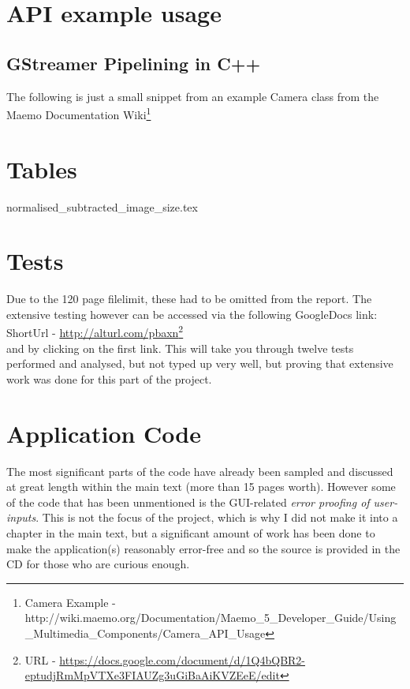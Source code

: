\section{API example usage}
\subsection{GStreamer Pipelining in C++}
 The following is just a small snippet from an example Camera class from the Maemo Documentation Wiki\footnote{Camera Example - http://wiki.maemo.org/Documentation/Maemo\_5\_Developer\_Guide/Using\_Multimedia\_Components/Camera\_API\_Usage}

\begin{frame}{}
\vspace{-20pt}

\end{frame}

\section{Tables}
{normalised_subtracted_image_size.tex}

\section{Tests}\label{append:tests}
Due to the 120 page filelimit, these had to be omitted from the report. The extensive testing however can be accessed via the following GoogleDocs link:\\\tab ShortUrl - \url{http://alturl.com/pbaxn}\footnote{URL - \url{https://docs.google.com/document/d/1Q4bQBR2-eptudjRmMpVTXe3FIAUZg3uGiBaAiKVZEeE/edit}}\\ and by clicking on the first link. This will take you through twelve tests performed and analysed, but not typed up very well, but proving that extensive work was done for this part of the project.

\section{Application Code}
The most significant parts of the code have already been sampled and discussed at great length within the main text (more than 15 pages worth). However some of the code that has been unmentioned is the GUI-related {\it error proofing of user-inputs}. This is not the focus of the project, which is why I did not make it into a chapter in the main text, but a significant amount of work has been done to make the application(s) reasonably error-free and so the source is provided in the CD for those who are curious enough.

